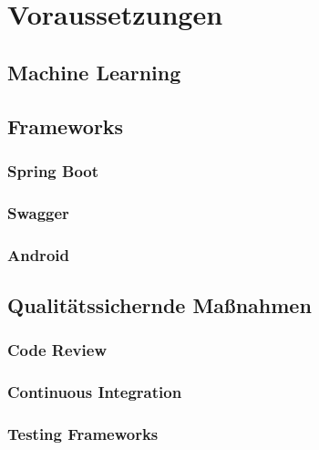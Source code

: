 \chapter{Voraussetzungen}

	\section{Machine Learning}
	
	\section{}

	\section{Frameworks}
	
		\subsection{Spring Boot}
		
		\subsection{Swagger}
		
		\subsection{Android}
		
	\section{Qualitätssichernde Maßnahmen}
	
		\subsection{Code Review}
		
	
		\subsection{Continuous Integration}
		
		\subsection{Testing Frameworks}
		
	